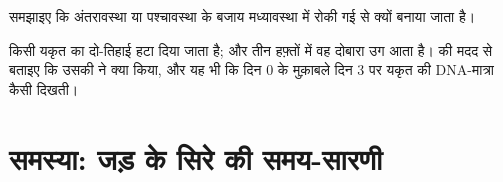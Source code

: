 \begin{exercise}[$\star\star\star$]\label{exo:g11:cell-cycle-mitosis:14}
समझाइए कि  अंतरावस्था या पश्चावस्था के बजाय मध्यावस्था में
रोकी गई  से क्यों बनाया जाता है।
\end{exercise}

\begin{exercise}[$\star\star\star$]\label{exo:g11:cell-cycle-mitosis:15}
किसी यकृत का दो-तिहाई हटा दिया जाता है; और तीन हफ़्तों में वह दोबारा उग
आता है।  की मदद से बताइए कि उसकी  ने क्या किया, और यह
भी कि दिन 0 के मुक़ाबले दिन 3 पर यकृत  की DNA-मात्रा कैसी दिखती।
\end{exercise}

\section{समस्या: जड़ के सिरे की समय-सारणी}

